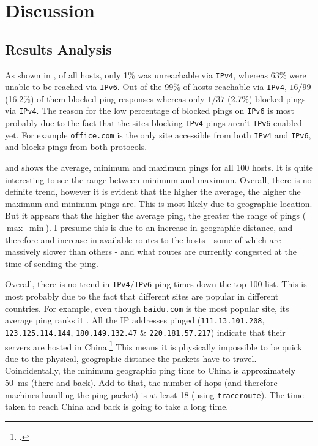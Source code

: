 \documentclass[a4paper]{article}
\def \IPF {\texttt{IPv4}}
\def \IPS {\texttt{IPv6}}
\begin{document}
\section{Discussion}
\subsection*{Results Analysis}

As shown in , of all hosts, only 1\% was unreachable via {\IPF}, whereas 63\% were unable to be reached via \IPS.
Out of the 99\% of hosts reachable via \IPF, $16/99$ (16.2\%) of them blocked ping responses whereas only $1/37$ (2.7\%) blocked pings via \IPF.
The reason for the low percentage of blocked pings on {\IPS} is most probably due to the fact that the sites blocking {\IPF} pings aren't {\IPS} enabled yet.
For example \texttt{office.com} is the only site accessible from both {\IPF} and {\IPS}, and blocks pings from both protocols.

 and  shows the average, minimum and maximum pings for all 100 hosts.
It is quite interesting to see the range between minimum and maximum.
Overall, there is no definite trend, however it is evident that the higher the average, the higher the maximum and minimum pings are.
This is most likely due to geographic location.
But it appears that the higher the average ping, the greater the range of pings ($ \textrm{max} - \textrm{min}$).
I presume this is due to an increase in geographic distance, and therefore and increase in available routes to the hosts -
  some of which are massively slower than others - and what routes are currently congested at the time of sending the ping.

Overall, there is no trend in {\IPF}/{\IPS} ping times down the top 100 list.
This is most probably due to the fact that different sites are popular in different countries.
For example, even though \texttt{baidu.com} is the  most popular site, its average ping ranks it .
All the IP addresses pinged (\texttt{111.13.101.208}, \texttt{123.125.114.144}, \texttt{180.149.132.47} \& \texttt{220.181.57.217})
  indicate that their servers are hosted in China.\footcite{ip_location}
This means it is physically impossible to be quick due to the physical, geographic distance the packets have to travel.
Coincidentally, the minimum geographic ping time to China is approximately \SI{50}{\milli\second} (there and back).
Add to that, the number of hops (and therefore machines handling the ping packet) is at least 18 (using \texttt{traceroute}).
The time taken to reach China and back is going to take a long time.
\end{document}
